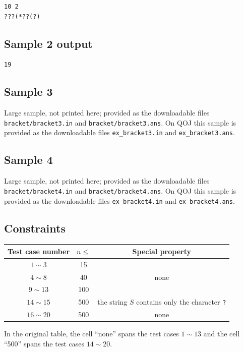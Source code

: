 \documentclass[11pt]{article}
\begin{document}
\begin{verbatim}
10 2
???(*??(?)
\end{verbatim}

\subsection*{Sample 2 output}

\begin{verbatim}
19
\end{verbatim}

\subsection*{Sample 3}

Large sample, not printed here;
provided as the downloadable files \texttt{bracket/bracket3.in} and \texttt{bracket/bracket3.ans}.
On QOJ this sample is provided as the downloadable files
\texttt{ex\_bracket3.in} and \texttt{ex\_bracket3.ans}.

\subsection*{Sample 4}

Large sample, not printed here;
provided as the downloadable files \texttt{bracket/bracket4.in} and \texttt{bracket/bracket4.ans}.
On QOJ this sample is provided as the downloadable files
\texttt{ex\_bracket4.in} and \texttt{ex\_bracket4.ans}.

\subsection*{Constraints}

\begin{center}
\begin{tabular}{ccc}
\toprule
Test case number & $n \le$ & Special property \\
\midrule
$1 \sim 3$ & 15 & \\
$4 \sim 8$ & 40 & none \\
$9 \sim 13$ & 100 & \\
\midrule
$14 \sim 15$ & 500 & the string $S$ contains only the character \texttt{?} \\
$16 \sim 20$ & 500 & none \\
\bottomrule
\end{tabular}
\end{center}

In the original table, the cell ``none'' spans the test cases
$1 \sim 13$ and the cell ``500'' spans the test cases $14 \sim 20$.
\end{document}
